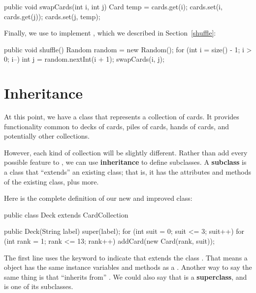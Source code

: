 \begin{code}
public void swapCards(int i, int j) {
    Card temp = cards.get(i);
    cards.set(i, cards.get(j));
    cards.set(j, temp);
}
\end{code}

Finally, we use  to implement , which we described in Section~\ref{shuffle}:

\begin{code}
public void shuffle() {
    Random random = new Random();
    for (int i = size() - 1; i > 0; i--) {
        int j = random.nextInt(i + 1);
        swapCards(i, j);
    }
}
\end{code}



\section{Inheritance}

At this point, we have a class that represents a collection of cards.
It provides functionality common to decks of cards, piles of cards, hands of cards, and potentially other collections.


However, each kind of collection will be slightly different.
Rather than add every possible feature to , we can use {\bf inheritance} to define subclasses.
A {\bf subclass} is a class that ``extends'' an existing class; that is, it has the attributes and methods of the existing class, plus more.

Here is the complete definition of our new and improved  class:

\begin{code}
public class Deck extends CardCollection {

    public Deck(String label) {
        super(label);
        for (int suit = 0; suit <= 3; suit++) {
            for (int rank = 1; rank <= 13; rank++) {
                addCard(new Card(rank, suit));
            }
        }
    }
}
\end{code}


The first line uses the keyword  to indicate that  extends the class .
That means a  object has the same instance variables and methods as a .
Another way to say the same thing is that  ``inherits from'' .
We could also say that  is a {\bf superclass}, and  is one of its subclasses.

